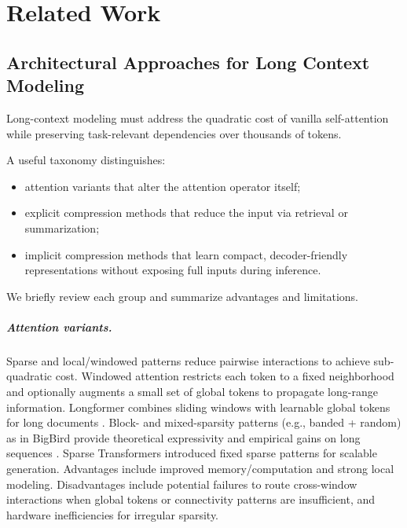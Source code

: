\chapter{Related Work}


\section{Architectural Approaches for Long Context Modeling}

Long-context modeling must address the quadratic cost of vanilla self-attention \cite{vaswani_attention_2017} while preserving task-relevant dependencies over thousands of tokens.

A useful taxonomy distinguishes:
\begin{itemize}
    \item attention variants that alter the attention operator itself;
    \item explicit compression methods that reduce the input via retrieval or summarization;
    \item implicit compression methods that learn compact, decoder-friendly representations without exposing full inputs during inference.
\end{itemize}

We briefly review each group and summarize advantages and limitations.

\paragraph{Attention variants.}
Sparse and local/windowed patterns reduce pairwise interactions to achieve sub-quadratic cost.
Windowed attention restricts each token to a fixed neighborhood and optionally augments a small set of global tokens to propagate long-range information.
Longformer combines sliding windows with learnable global tokens for long documents \cite{beltagy_longformer_2020}.
Block- and mixed-sparsity patterns (e.g., banded + random) as in BigBird provide theoretical expressivity and empirical gains on long sequences \cite{zaheer_bigbird_2020}.
Sparse Transformers \cite{child_sparse_2019} introduced fixed sparse patterns for scalable generation.
Advantages include improved memory/computation and strong local modeling.
Disadvantages include potential failures to route cross-window interactions when global tokens or connectivity patterns are insufficient, and hardware inefficiencies for irregular sparsity.

